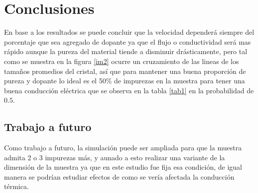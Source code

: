 \documentclass[9pt,twocolumn,twoside]{osajnl}
\begin{document}
\section{Conclusiones}
En base a los resultados se puede concluir que la velocidad dependerá siempre del porcentaje que sea agregado de dopante ya que el flujo o conductividad será mas rápido aunque la pureza del material tiende a disminuir drásticamente, pero tal como se muestra en la figura \ref{im2} ocurre un cruzamiento de las lineas de los tamaños promedios del cristal, así que para mantener una buena proporción de pureza y dopante lo ideal es el 50\% de impurezas en la muestra para tener una buena conducción eléctrica que se observa en la tabla \ref{tab1} en la probabilidad de $0.5$. 

\subsection{Trabajo a futuro}
Como trabajo a futuro, la simulación puede ser ampliada para que la muestra admita 2 o 3 impurezas más, y aunado a esto realizar una variante de la dimensión de la muestra ya que en este estudio fue fija esa condición, de igual manera se podrían estudiar efectos de como se vería afectada la conducción térmica.



\end{document}
